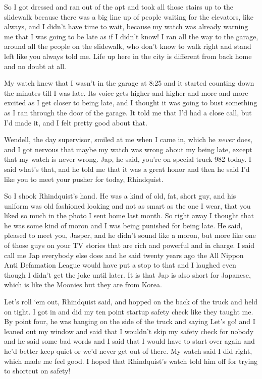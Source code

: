 So I got dressed and ran out of the apt and took all those stairs up to 
the slidewalk because there was a big line up of people waiting for the 
elevators, like always, and I didn't have time to wait, because my 
watch was already warning me that I was going to be late as if I didn't 
know! I ran all the way to the garage, around all the people on the 
slidewalk, who don't know to walk right and stand left like you always 
told me. Life up here in the city is different from back home and no 
doubt at all.

My watch knew that I wasn't in the garage at 8:25 and it started 
counting down the minutes till I was late. Its voice gets higher and 
higher and more and more excited as I get closer to being late, and I 
thought it was going to bust something as I ran through the door of the 
garage. It told me that I'd had a close call, but I'd made it, and I 
felt pretty good about that.

Wendell, the day supervisor, smiled at me when I came in, which he 
\emph{never} does, and I got nervous that maybe my watch was wrong 
about my being late, except that my watch is never wrong. Jap, he said, 
you're on special truck 982 today. I said what's that, and he told me 
that it was a great honor and then he said I'd like you to meet your 
pusher for today, Rhindquist.

So I shook Rhindquist's hand. He was a kind of old, fat, short guy, and 
his uniform was old fashioned looking and not as smart as the one I 
wear, that you liked so much in the photo I sent home last month. So 
right away I thought that he was some kind of moron and I was being 
punished for being late. He said, pleased to meet you, Jasper, and he 
didn't sound like a moron, but more like one of those guys on your TV 
stories that are rich and powerful and in charge. I said call me Jap 
everybody else does and he said twenty years ago the All Nippon Anti 
Defamation League would have put a stop to that and I laughed even 
though I didn't get the joke until later. It is that Jap is also short 
for Japanese, which is like the Moonies but they are from Korea.

Let's roll `em out, Rhindquist said, and hopped on the back of the 
truck and held on tight. I got in and did my ten point startup safety 
check like they taught me. By point four, he was banging on the side of 
the truck and saying Let's go! and I leaned out my window and said that 
I wouldn't skip my safety check for nobody and he said some bad words 
and I said that I would have to start over again and he'd better keep 
quiet or we'd never get out of there. My watch said I did right, which 
made me feel good. I hoped that Rhindquist's watch told him off for 
trying to shortcut on safety!

